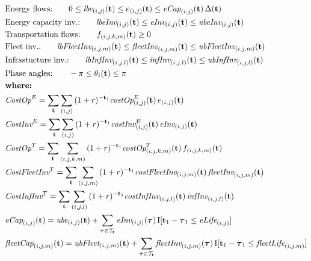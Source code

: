 \documentclass{article}
\begin{document}
{\begin{align}
& \text{Energy flows:} \qquad 0 \le \emph{lbe}_{(i,j)}(\textbf{t}) \le e_{(i,j)}(\textbf{t}) \le \emph{eCap}_{(i,j)}(\textbf{t}) \, \Delta(\textbf{t}) \label{eqn:Eflow} \\
& \text{Energy capacity inv.:} \qquad \emph{lbeInv}_{(i,j)}(\textbf{t}) \le \emph{eInv}_{(i,j)}(\textbf{t}) \le \emph{ubeInv}_{(i,j)}(\textbf{t}) \label{eqn:Einvvar} \\
& \text{Transportation flows:} \qquad f_{(i,j,k,m)}(\textbf{t}) \ge 0 \label{eqn:Tflow} \\
& \text{Fleet inv.:} \qquad \emph{lbFleetInv}_{(i,j,m)}(\textbf{t}) \le \emph{fleetInv}_{(i,j,m)}(\textbf{t}) \le \emph{ubFleetInv}_{(i,j,m)}(\textbf{t}) \label{eqn:Tfleetvar} \\
& \text{Infrastucture inv.:} \qquad \emph{lbInfInv}_{(i,j,l)}(\textbf{t}) \le \emph{infInv}_{(i,j,l)}(\textbf{t}) \le \emph{ubInfInv}_{(i,j,l)}(\textbf{t}) \label{eqn:Tinfvar} \\
& \text{Phase angles:} \qquad -\pi \le \theta_i(\textbf{t}) \le \pi \label{eqn:angles} \\
& \textbf{where:} \nonumber \\
& \emph{CostOp}^E = \sum_\textbf{t}{\sum_{(i,j)}{(1+r)^{-\textbf{t}_1} \emph{costOp}^E_{(i,j)}(\textbf{t}) \, e_{(i,j)}(\textbf{t})}} \label{eqn:Eopcost} \\
& \emph{CostInv}^E = \sum_\textbf{t}{\sum_{(i,j)}{(1+r)^{-\textbf{t}_1} \emph{costInv}^E_{(i,j)}(\textbf{t}) \, \emph{eInv}_{(i,j)}(\textbf{t})}}  \label{eqn:Einvcost} \\
& \emph{CostOp}^T = \sum_\textbf{t}{\sum_{(i,j,k,m)}{(1+r)^{-\textbf{t}_1} \emph{costOp}^T_{(i,j,k,m)}(\textbf{t}) \, f_{(i,j,k,m)}(\textbf{t})}} \label{eqn:Topcost} \\
& \emph{CostFleetInv}^T = \sum_\textbf{t}{ \sum_{(i,j,m)}{ (1+r)^{-\textbf{t}_1} \emph{costFleetInv}_{(i,j,m)}(\textbf{t}) \, \emph{fleetInv}_{(i,j,m)}(\textbf{t}) } } \label{eqn:Tfleetinvcost} \\
& \emph{CostInfInv}^T = \sum_\textbf{t}{ \sum_{(i,j,l)}{ (1+r)^{-\textbf{t}_1} \emph{costInfInv}_{(i,j,l)}(\textbf{t}) \, \emph{infInv}_{(i,j,l)}(\textbf{t}) } }  \label{eqn:Tinfinvcost} \\
& \emph{eCap}_{(i,j)}(\textbf{t}) = \emph{ube}_{(i,j)}(\textbf{t}) + \sum_{\boldsymbol\tau \in \mathcal{T}_\textbf{t}}{\emph{eInv}_{(i,j)}(\boldsymbol\tau)} \, \textup{I}[\textbf{t}_1 - \boldsymbol\tau_1 \le \emph{eLife}_{(i,j)} ] \label{eqn:Ecap} \\
& \emph{fleetCap}_{(i,j,m)}(\textbf{t}) = \emph{ubFleet}_{(i,j,m)}(\textbf{t}) + \sum_{\boldsymbol\tau \in \mathcal{T}_\textbf{t}}{\emph{fleetInv}_{(i,j,m)}(\boldsymbol\tau)} \, \textup{I}[\textbf{t}_1 - \boldsymbol\tau_1 \le \emph{fleetLife}_{(i,j,m)} ] \label{eqn:Tfleetcap} \\

\end{align}}
\end{document}
